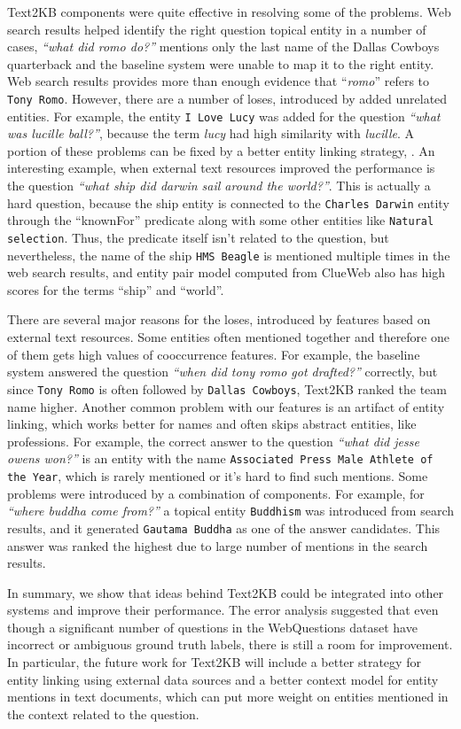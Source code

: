 Text2KB components were quite effective in resolving some of the problems.
Web search results helped identify the right question topical entity in a number of cases, \eg \textit{``what did romo do?''} mentions only the last name of the Dallas Cowboys quarterback and the baseline system were unable to map it to the right entity.
Web search results provides more than enough evidence that ``\textit{romo}'' refers to \texttt{Tony Romo}.
However, there are a number of loses, introduced by added unrelated entities.
For example, the entity \texttt{I Love Lucy} was added for the question \textit{``what was lucille ball?''}, because the term \textit{lucy} had high similarity with \textit{lucille}.
A portion of these problems can be fixed by a better entity linking strategy, \eg \cite{SMAPH_ERD:2014}.
An interesting example, when external text resources improved the performance is the question \textit{``what ship did darwin sail around the world?''}.
This is actually a hard question, because the ship entity is connected to the \texttt{Charles Darwin} entity through the ``knownFor'' predicate along with some other entities like \texttt{Natural selection}.
Thus, the predicate itself isn't related to the question, but nevertheless, the name of the ship \texttt{HMS Beagle} is mentioned multiple times in the web search results, and entity pair model computed from ClueWeb also has high scores for the terms ``ship'' and ``world''.

There are several major reasons for the loses, introduced by features based on external text resources.
Some entities often mentioned together and therefore one of them gets high values of cooccurrence features.
For example, the baseline system answered the question \textit{``when did tony romo got drafted?''} correctly, but since \texttt{Tony Romo} is often followed by \texttt{Dallas Cowboys}, Text2KB ranked the team name higher.
Another common problem with our features is an artifact of entity linking, which works better for names and often skips abstract entities, like professions.
For example, the correct answer to the question \textit{``what did jesse owens won?''} is an entity with the name \texttt{Associated Press Male Athlete of the Year}, which is rarely mentioned or it's hard to find such mentions.
Some problems were introduced by a combination of components.
For example, for \textit{``where buddha come from?''} a topical entity \texttt{Buddhism} was introduced from search results, and it generated \texttt{Gautama Buddha} as one of the answer candidates.
This answer was ranked the highest due to large number of mentions in the search results.

In summary, we show that ideas behind Text2KB could be integrated into other systems and improve their performance.
The error analysis suggested that even though a significant number of questions in the WebQuestions dataset have incorrect or ambiguous ground truth labels, there is still a room for improvement.
In particular, the future work for Text2KB will include a better strategy for entity linking using external data sources and a better context model for entity mentions in text documents, which can put more weight on entities mentioned in the context related to the question.

